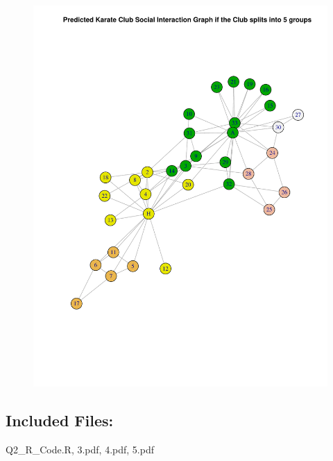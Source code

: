 \documentclass[a4paper, 11pt]{article}
\begin{document}
\begin{figure}[H]
\centering
\includegraphics[scale=0.7]{5.pdf}
\end{figure}

\subsection*{Included Files:}
Q2\_R\_Code.R, 3.pdf, 4.pdf, 5.pdf
\end{document}
